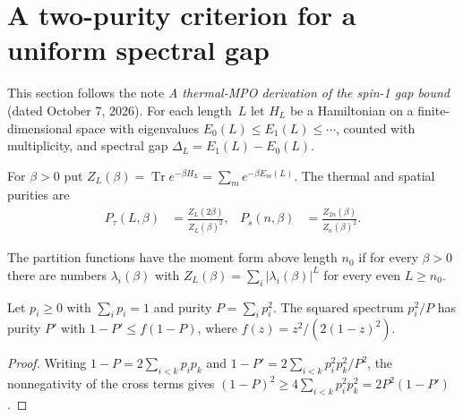 \section{A two-purity criterion for a uniform spectral gap}

This section follows the note \emph{A thermal-MPO derivation of the spin-1 gap
bound} (dated October 7, 2026). For each length~$L$ let $H_L$ be a Hamiltonian
on a finite-dimensional space with eigenvalues $E_0(L)\le E_1(L)\le\cdots$,
counted with multiplicity, and spectral gap $\Delta_L=E_1(L)-E_0(L)$.

\begin{definition}\label{def:thermal_spatial_purity}
    \leanok
    For $\beta>0$ put $Z_L(\beta)=\operatorname{Tr}e^{-\beta H_L}
        =\sum_m e^{-\beta E_m(L)}$. The thermal and spatial purities are
    \begin{align}
        P_\tau(L,\beta) & =\frac{Z_L(2\beta)}{Z_L(\beta)^2},
                        &
        P_s(n,\beta)    & =\frac{Z_{2n}(\beta)}{Z_n(\beta)^2}.
    \end{align}
\end{definition}

\begin{definition}\label{def:spatial_moment_form}
    \leanok
    The partition functions have the moment form above length $n_0$ if for
    every $\beta>0$ there are numbers $\lambda_i(\beta)$ with
    $Z_L(\beta)=\sum_i|\lambda_i(\beta)|^L$ for every even $L\ge n_0$.
\end{definition}

\begin{lemma}[Squaring]\label{lem:purity_squaring}
    \leanok
    Let $p_i\ge0$ with $\sum_ip_i=1$ and purity $P=\sum_ip_i^2$. The squared
    spectrum $p_i^2/P$ has purity $P'$ with
    $1-P'\le f(1-P)$, where $f(z)=z^2/(2(1-z)^2)$.
\end{lemma}

\begin{proof}
    \leanok
    Writing $1-P=2\sum_{i<k}p_ip_k$ and $1-P'=2\sum_{i<k}p_i^2p_k^2/P^2$, the
    nonnegativity of the cross terms gives
    $(1-P)^2\ge4\sum_{i<k}p_i^2p_k^2=2P^2(1-P')$.
\end{proof}

